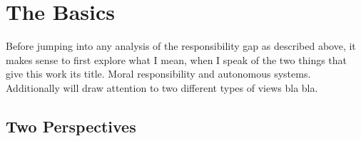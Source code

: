 \documentclass{article}
\begin{document}
%
%
%
%
%
\section{The Basics}


Before jumping into any analysis of the responsibility gap as described above,
it makes sense to first explore what I mean, when I speak of the two things that
give this work its title. Moral responsibility and autonomous systems.
Additionally will draw attention to two different types of views bla bla.
\subsection{Two Perspectives}

\end{document}

